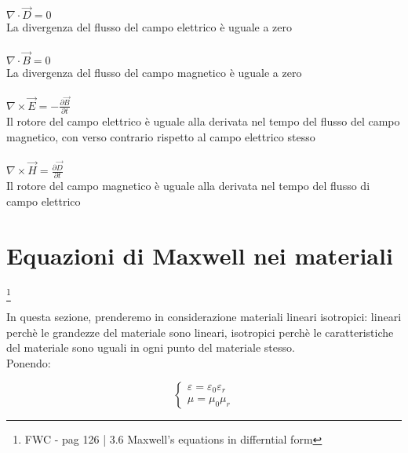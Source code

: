 \begin{tcolorbox}
    
    $\nabla \cdot \vec{D} = 0$ \\
    La divergenza del flusso del campo elettrico è uguale a zero \\ \\ 

    $\nabla \cdot \vec{B} = 0$ \\
    La divergenza del flusso del campo magnetico è uguale a zero \\ \\ 

    $\nabla \times \vec{E} = -\frac{\partial \vec{B}}{\partial t}$ \\
    Il rotore del campo elettrico è uguale alla derivata nel tempo del flusso del campo magnetico, 
    con verso contrario rispetto al campo elettrico stesso \\ \\ 

    $\nabla \times \vec{H} = \frac{\partial \vec{D}}{\partial t}$ \\ 
    Il rotore del campo magnetico è uguale alla derivata nel tempo del flusso di campo elettrico 

\end{tcolorbox} 

\newpage 

\section{Equazioni di Maxwell nei materiali} 

\footnote{FWC - pag 126 | 3.6 Maxwell's equations in differntial form} 

In questa sezione, prenderemo in considerazione materiali lineari isotropici:
lineari perchè le grandezze del materiale sono lineari, 
isotropici perchè le caratteristiche del materiale 
sono uguali in ogni punto del materiale stesso. \\ 

Ponendo: 

{ \Large \begin{equation}
    \begin{cases}
        
        \varepsilon = \varepsilon_0 \varepsilon_r \\ 
        \mu = \mu_0 \mu_r 

    \end{cases}
\end{equation}} 


